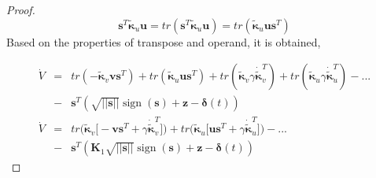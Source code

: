 \documentclass[sn-mathphys-num]{sn-jnl}
\DeclareMathOperator{\sign}{sign}
\theoremstyle{thmstyleone}%
\theoremstyle{thmstyletwo}%
\theoremstyle{thmstylethree}%
\begin{document}
\begin{proof}
\begin{equation}
 \mathbf{s}^T \boldsymbol{\tilde{\kappa}}_u\mathbf{u} =tr (\mathbf{s}^T \boldsymbol{\tilde{\kappa}}_u\mathbf{u})=tr( \boldsymbol{\tilde{\kappa}}_u\mathbf{u}\mathbf{s}^T)
\end{equation}
Based on the properties of transpose and operand, it is obtained,

\begin{eqnarray}\label{eq:Lyapunto}
    \nonumber\dot{V} &=& tr( -\boldsymbol{\tilde{\kappa}}_v\mathbf{v}\mathbf{s}^T)+tr( \boldsymbol{\tilde{\kappa}}_u\mathbf{u}\mathbf{s}^T) + tr(\boldsymbol{\tilde{\kappa}}_v\gamma\boldsymbol{\dot{\tilde{\kappa}}}_v^T)+ tr (\boldsymbol{\tilde{\kappa}}_u\gamma \boldsymbol{\dot{\tilde{\kappa}}}_u^T) -...\\
    \nonumber&-&\mathbf{s}^T\left(\sqrt{||\mathbf{s}||}\sign(\mathbf{s}) +\mathbf{z}
     -\boldsymbol{\delta}(t) \right) \nonumber\\
    \dot{V} &=& tr\Big( \boldsymbol{\tilde{\kappa}}_v\big[-\mathbf{v}\mathbf{s}^T+\gamma\boldsymbol{\dot{\tilde{\kappa}}}_v^T\big]\Big)+tr\Big( \boldsymbol{\tilde{\kappa}}_u\big[\mathbf{u}\mathbf{s}^T +\gamma \boldsymbol{\dot{\tilde{\kappa}}}_u^T\big]\Big)  -...\\
     \nonumber&-& \mathbf{s}^T\left(\mathbf{K}_1\sqrt{||\mathbf{s}||}\sign(\mathbf{s}) + \mathbf{z}
     -\boldsymbol{\delta}(t) \right)
\end{eqnarray}


\end{proof}
\end{document}
